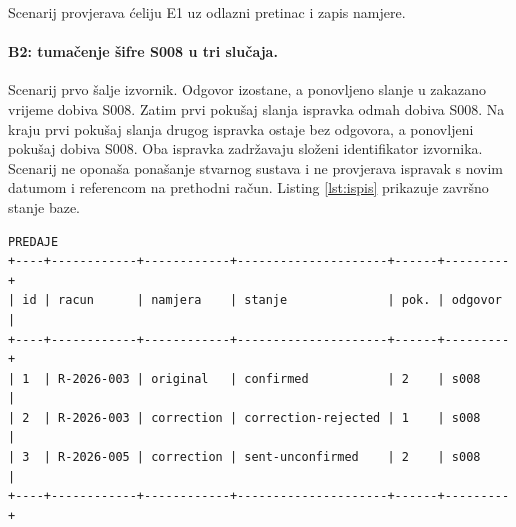 Scenarij provjerava ćeliju E1 uz odlazni pretinac i zapis namjere.

\paragraph{B2: tumačenje šifre S008 u tri slučaja.}
Scenarij prvo šalje izvornik. Odgovor izostane, a ponovljeno slanje u
zakazano vrijeme dobiva S008. Zatim prvi pokušaj slanja ispravka odmah
dobiva S008. Na kraju prvi pokušaj slanja drugog ispravka ostaje bez
odgovora, a ponovljeni pokušaj dobiva S008. Oba ispravka zadržavaju složeni
identifikator izvornika. Scenarij ne oponaša ponašanje stvarnog sustava i ne
provjerava ispravak s novim datumom i referencom na prethodni račun.
Listing \ref{lst:ispis} prikazuje završno stanje baze.

\noindent\begin{minipage}{\textwidth}
\begin{lstlisting}[caption={[Završno stanje baze nakon scenarija
B2]Završno stanje nakon scenarija B2, izlaz naredbe \texttt{php artisan
state}. Tri modelirana slučaja daju različite ishode tumačenja šifre S008.
Radi širine stranice izostavljeni su stupac \texttt{ishod poznat} iz prve
tablice te iz druge tablice stupac nazvan \texttt{iz}; ostalo je prepisano doslovno.},
label={lst:ispis}, basicstyle=\ttfamily\scriptsize]
PREDAJE
+----+------------+------------+---------------------+------+---------+
| id | racun      | namjera    | stanje              | pok. | odgovor |
+----+------------+------------+---------------------+------+---------+
| 1  | R-2026-003 | original   | confirmed           | 2    | s008    |
| 2  | R-2026-003 | correction | correction-rejected | 1    | s008    |
| 3  | R-2026-005 | correction | sent-unconfirmed    | 2    | s008    |
+----+------------+------------+---------------------+------+---------+


\end{lstlisting}
\end{minipage}
